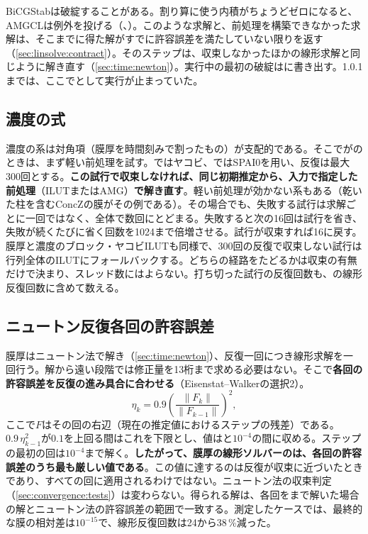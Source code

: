 BiCGStabは破綻することがある。割り算に使う内積がちょうどゼロになると、AMGCLは例外を投げる（、）。このような求解と、前処理を構築できなかった求解は、そこまでに得た解がすでに許容誤差を満たしていない限りを返す（\cref{sec:linsolve:contract}）。そのステップは、収束しなかったほかの線形求解と同じように解き直す（\cref{sec:time:newton}）。実行中の最初の破綻はに書き出す。1.0.1までは、ここでとして実行が止まっていた。

\subsection{濃度の式}
\label{sec:linsolve:conc}

濃度の系は対角項（膜厚を時間刻みで割ったもの）が支配的である。そこでがのときは、まず軽い前処理を試す。ではヤコビ、ではSPAI0を用い、反復は最大300回とする。\textbf{この試行で収束しなければ、同じ初期推定から、入力で指定した前処理}（ILUTまたはAMG）\textbf{で解き直す}。軽い前処理が効かない系もある（乾いた柱を含むConcZの膜がその例である）。その場合でも、失敗する試行は求解ごとに一回ではなく、全体で数回にとどまる。失敗すると次の16回は試行を省き、失敗が続くたびに省く回数を1024まで倍増させる。試行が収束すれば16に戻す。膜厚と濃度のブロック・ヤコビILUTも同様で、300回の反復で収束しない試行は行列全体のILUTにフォールバックする。どちらの経路をたどるかは収束の有無だけで決まり、スレッド数にはよらない。打ち切った試行の反復回数も、の線形反復回数に含めて数える。

\subsection{ニュートン反復各回の許容誤差}
\label{sec:linsolve:ew}

膜厚はニュートン法で解き（\cref{sec:time:newton}）、反復一回につき線形求解を一回行う。解から遠い段階では修正量を13桁まで求める必要はない。そこで\textbf{各回の許容誤差を反復の進み具合に合わせる}（Eisenstat--Walkerの選択2）。
\[
  \eta_k = 0.9\left(\frac{\lVert F_k\rVert}{\lVert F_{k-1}\rVert}\right)^{2},
\]
ここで$F$はその回の右辺（現在の推定値におけるステップの残差）である。$0.9\,\eta_{k-1}^2$が$0.1$を上回る間はこれを下限とし、値はと$10^{-4}$の間に収める。ステップの最初の回は$10^{-4}$まで解く。\textbf{したがって、膜厚の線形ソルバーのは、各回の許容誤差のうち最も厳しい値である}。この値に達するのは反復が収束に近づいたときであり、すべての回に適用されるわけではない。ニュートン法の収束判定（\cref{sec:convergence:tests}）は変わらない。得られる解は、各回をまで解いた場合の解とニュートン法の許容誤差の範囲で一致する。測定したケースでは、最終的な膜の相対差は$10^{-15}$で、線形反復回数は24から38\,\%減った。

